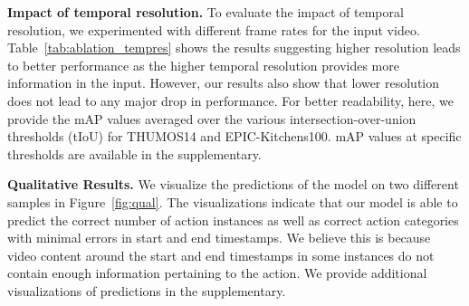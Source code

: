 \documentclass[10pt,twocolumn,letterpaper]{article}
\begin{document}
 \setlength{\tabcolsep}{4pt}
\renewcommand{\arraystretch}{0.95}
\begin{table}[t]
\centering
\caption{\textbf{ Ablation Study (Impact of temporal resolution).} Performance of our AGT for different temporal resolutions of input video. Here, SR indicates sampling rate of frames for feature extraction, \ie, SR=1/$k$ means frames sampled at 1/$k$ -th factor of the original frame rate. EPIC(A), EPIC (V), EPIC (N) indicate tasks `Action', `Verb', `Noun' on dataset EPIC-Kitchens100. We report mAP for evaluation (higher is better).}
\vspace{-4mm}
\label{tab:ablation_tempres}
\end{table}
 

\vspace{0.05in}
\noindent
\textbf{Impact of temporal resolution.} To evaluate the impact of temporal resolution, we experimented with different frame rates for the input video. Table~\ref{tab:ablation_tempres} shows the results suggesting higher resolution leads to better performance as the higher temporal resolution provides more information in the input. However, our results also show that lower resolution does not lead to any major drop in performance. For better readability, here, we provide the mAP values averaged over the various intersection-over-union thresholds (tIoU) for THUMOS14 and EPIC-Kitchens100. mAP values at specific thresholds are available in the supplementary.


\vspace{0.05in}
\noindent 
\textbf{Qualitative Results.}
We visualize the predictions of the model on two different samples in Figure~\ref{fig:qual}. The visualizations indicate that our model is able to predict the correct number of action instances as well as correct action categories with minimal errors in start and end timestamps. We believe this is because video content around the start and end timestamps in some instances do not contain enough information pertaining to the action. We provide additional visualizations of  predictions in the supplementary. 
\end{document}
